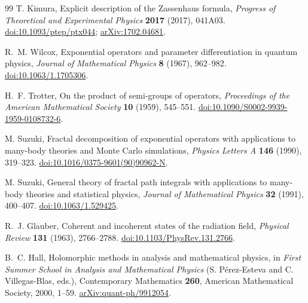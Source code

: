\begin{thebibliography}{99}
T. Kimura,
Explicit description of the Zassenhaus formula,
\emph{Progress of Theoretical and Experimental Physics} \textbf{2017} (2017), 041A03.
\href{https://doi.org/10.1093/ptep/ptx044}{doi:10.1093/ptep/ptx044};
\href{https://arxiv.org/abs/1702.04681}{arXiv:1702.04681}.

R.~M. Wilcox,
Exponential operators and parameter differentiation in quantum physics,
\emph{Journal of Mathematical Physics} \textbf{8} (1967), 962--982.
\href{https://doi.org/10.1063/1.1705306}{doi:10.1063/1.1705306}.

H.~F. Trotter,
On the product of semi-groups of operators,
\emph{Proceedings of the American Mathematical Society} \textbf{10} (1959), 545--551.
\href{https://doi.org/10.1090/S0002-9939-1959-0108732-6}{doi:10.1090/S0002-9939-1959-0108732-6}.

M. Suzuki,
Fractal decomposition of exponential operators with applications to
many-body theories and Monte Carlo simulations,
\emph{Physics Letters A} \textbf{146} (1990), 319--323.
\href{https://doi.org/10.1016/0375-9601(90)90962-N}{doi:10.1016/0375-9601(90)90962-N}.

M. Suzuki,
General theory of fractal path integrals with applications to many-body
theories and statistical physics,
\emph{Journal of Mathematical Physics} \textbf{32} (1991), 400--407.
\href{https://doi.org/10.1063/1.529425}{doi:10.1063/1.529425}.

R.~J. Glauber,
Coherent and incoherent states of the radiation field,
\emph{Physical Review} \textbf{131} (1963), 2766--2788.
\href{https://doi.org/10.1103/PhysRev.131.2766}{doi:10.1103/PhysRev.131.2766}.

B.~C. Hall,
Holomorphic methods in analysis and mathematical physics, in
\emph{First Summer School in Analysis and Mathematical Physics}
(S. P\'erez-Esteva and C. Villegas-Blas, eds.), Contemporary Mathematics
\textbf{260}, American Mathematical Society, 2000, 1--59.
\href{https://arxiv.org/abs/quant-ph/9912054}{arXiv:quant-ph/9912054}.

\end{thebibliography}
\endgroup

